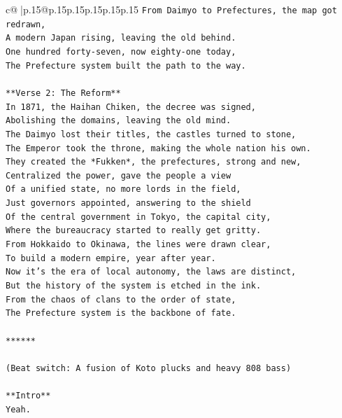 \documentclass{article}
\begin{document}
{\begin{supertabular}{c@{$\;$}|p{.15\linewidth}@{}p{.15\linewidth}p{.15\linewidth}p{.15\linewidth}p{.15\linewidth}p{.15\linewidth}}
{{{\texttt{From Daimyo to Prefectures, the map got redrawn,} \\
\texttt{A modern Japan rising, leaving the old behind.} \\
\texttt{One hundred forty{-}seven, now eighty{-}one today,} \\
\texttt{The Prefecture system built the path to the way.} \\
\\ 
\texttt{**Verse 2: The Reform**} \\
\texttt{In 1871, the Haihan Chiken, the decree was signed,} \\
\texttt{Abolishing the domains, leaving the old mind.} \\
\texttt{The Daimyo lost their titles, the castles turned to stone,} \\
\texttt{The Emperor took the throne, making the whole nation his own.} \\
\texttt{They created the *Fukken*, the prefectures, strong and new,} \\
\texttt{Centralized the power, gave the people a view} \\
\texttt{Of a unified state, no more lords in the field,} \\
\texttt{Just governors appointed, answering to the shield} \\
\texttt{Of the central government in Tokyo, the capital city,} \\
\texttt{Where the bureaucracy started to really get gritty.} \\
\texttt{From Hokkaido to Okinawa, the lines were drawn clear,} \\
\texttt{To build a modern empire, year after year.} \\
\texttt{Now it's the era of local autonomy, the laws are distinct,} \\
\texttt{But the history of the system is etched in the ink.} \\
\texttt{From the chaos of clans to the order of state,} \\
\texttt{The Prefecture system is the backbone of fate.} \\
\\ 
\texttt{******} \\
\\ 
\texttt{(Beat switch: A fusion of Koto plucks and heavy 808 bass)} \\
\\ 
\texttt{**Intro**} \\
\texttt{Yeah.} \\
}}}
\end{supertabular}}
\end{document}

